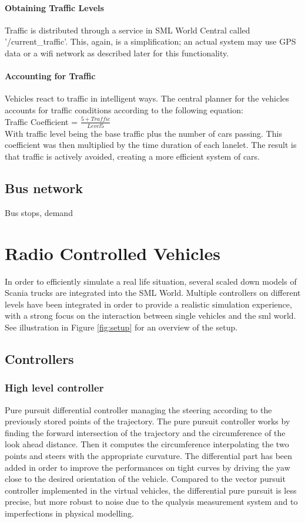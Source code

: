 \documentclass[11pt,a4paper]{book}
\begin{document}
\subsubsection{Obtaining Traffic Levels}
Traffic is distributed through a service in SML World Central called '/current\_traffic'. This, again, is a simplification; an actual system may use GPS data or a wifi network as described later for this functionality.
 
\subsubsection{Accounting for Traffic}
Vehicles react to traffic in intelligent ways. The central planner for the vehicles accounts for traffic conditions according to the following equation: \\
 
 Traffic Coefficient = $\frac{5 + Traffic}{Level5}$ \\

\noindent With traffic level being the base traffic plus the number of cars passing. This coefficient was then multiplied by the time duration of each lanelet. The result is that traffic is actively avoided, creating a more efficient system of cars.


\section{Bus network}
Bus stops, demand

\chapter{Radio Controlled Vehicles}
In order to efficiently simulate a real life situation, several scaled down models of Scania trucks are integrated into the SML World. Multiple controllers on different levels have been integrated in order to provide a realistic simulation experience, with a strong focus on the interaction between single vehicles and the sml world. See illustration in Figure \ref{fig:setup} for an overview of the setup.

\section{Controllers}
\subsection{High level controller}
Pure pursuit differential controller managing the steering according to the previously stored points of the trajectory. The pure pursuit controller works by finding the forward intersection of the trajectory and the circumference of the look ahead distance. Then it computes the circumference interpolating the two points and steers with the appropriate curvature. The differential part has been added in order to improve the performances on tight curves by driving the yaw close to the desired orientation of the vehicle. Compared to the vector pursuit controller implemented in the virtual vehicles, the differential pure pursuit is less precise, but more robust to noise due to the qualysis measurement system and to imperfections in physical modelling.
\end{document}
